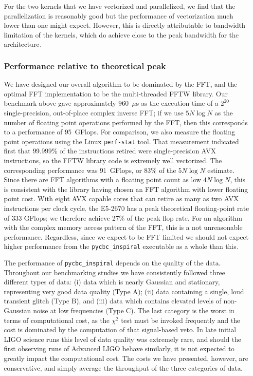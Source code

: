 \enlargethispage*{1000pt}
For the two kernels that we have vectorized and parallelized, we
find that the parallelization is reasonably good but the performance of
vectorization much lower than one might expect. However, this is directly
attributable to bandwidth limitation of the kernels, which do achieve close to
the peak bandwidth for the architecture.
\vspace*{15pt}

\newpage

\vspace*{-40pt}
\subsubsection{Performance relative to theoretical peak}
\vspace*{-05pt}
\label{sec:perf-relat-theor}

We have designed our overall algorithm to be dominated by
the FFT, and the optimal FFT implementation to be the multi-threaded FFTW
library. Our benchmark above gave approximately 960~$\mu$s as the execution time
of a $2^{20}$ single-precision, out-of-place complex inverse FFT; if we use
$5N\log{N}$ as the number of floating point 
operations performed by the FFT, then this corresponds to a performance of
95~GFlops. For comparison, we also measure the floating point operations using
the Linux \texttt{perf-stat} tool.  That measurement indicated first that
99.999\% of the instructions retired were single-precision AVX instructions, so
the FFTW library code is extremely well vectorized.  The corresponding
performance was 91~GFlops, or 83\% of the $5N\log{N}$ estimate. Since there are
FFT algorithms with a floating point count as low $4N\log{N}$, this is
consistent with the library having chosen an FFT algorithm with lower floating
point cost.  With eight AVX capable cores that can retire as many as two AVX
instructions per clock cycle, the E5-2670 has a peak theoretical floating-point
rate of 333 GFlops; we therefore achieve 27\% of the peak flop rate.  For an
algorithm with the complex memory access pattern of the FFT, this is a not
unreasonable performance. Regardless, since we expect to be FFT limited we
should not expect higher performance from the \texttt{pycbc\_inspiral}
executable as a whole than this. 

The performance of \texttt{pycbc\_inspiral} depends on the quality of the
data. Throughout our benchmarking studies we have consistently followed three
different types of data: (i) data which is nearly Gaussian and stationary,
representing very good data quality (Type A); (ii) data containing a single,
loud transient glitch (Type B), and (iii) data which contains elevated levels of
non-Gaussian noise at low frequencies (Type C).  The last category is the
worst in terms of computational cost, as the $\chi^2$ test must be invoked
frequently and the cost is dominated by the computation of that signal-based
veto. In late initial LIGO science runs this level of data quality was
extremely rare, and should the first observing runs of Advanced LIGO behave
similarly, it is not expected to greatly impact the computational cost.  The
costs we have presented, however, are conservative, and simply average the
throughput of the three categories of data.

